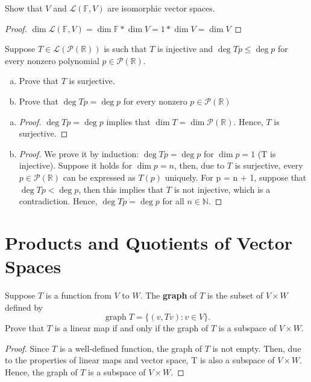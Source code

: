 \begin{exercise}
Show that $V$ and $\mathcal{L}(\mathbb{F}, V)$ are isomorphic vector spaces.
\end{exercise}
\begin{proof}
	$\operatorname{dim} \mathcal{L}(\mathbb{F}, V) = \operatorname{dim} \mathbb{F} * \operatorname{dim}V = 1 * \operatorname{dim} V = \operatorname{dim} V$
\end{proof}

\newpage

\begin{exercise}
Suppose $T \in \mathcal{L}(\mathcal{P}(\mathbb{R}))$ is such that $T$ is injective and $\operatorname{deg} Tp \le \operatorname{deg} p$ for every nonzero polynomial $p \in \mathcal{P}(\mathbb{R})$.
\begin{enumerate}[(a)]
	\item Prove that $T$ is surjective.
	\item Prove that $\operatorname{deg}Tp = \operatorname{deg}p$ for every nonzero $p \in \mathcal{P}(\mathbb{R})$
\end{enumerate}
\end{exercise}
\begin{enumerate}[(a)]
	\item \begin{proof}
		      $\operatorname{deg}Tp = \operatorname{deg}p$ implies that $\operatorname{dim} T = \operatorname{dim} \mathcal{P}(\mathbb{R})$. Hence, $T$ is surjective.
	      \end{proof}
	\item \begin{proof}
		      We prove it by induction: $\operatorname{deg}Tp = \operatorname{deg}p$ for $\operatorname{dim}p = 1$ (T is injective). Suppose it holds for $\operatorname{dim} p = n$, then, due to $T$ is surjective, every  $p \in \mathcal{P}(\mathbb{R})$ can be expressed as $T(p)$ uniquely. For p = n + 1, suppose that $\operatorname{deg}Tp < \operatorname{deg}p$, then this implies that $T$ is not injective, which is a contradiction. Hence, $\operatorname{deg}Tp = \operatorname{deg}p$ for all $n \in \mathbb{N}$.
	      \end{proof}
\end{enumerate}

\section{Products and Quotients of Vector Spaces}

\begin{exercise}
Suppose $T $ is a function from $V $ to $W $. The \textbf{graph} of $T $ is the subset of $V \times W$ defined by \[
	\operatorname{graph} T = \{(v, Tv) : v \in V\}.\]
Prove that $T$ is a linear map if and only if the graph of $T$ is a subspace of $V \times W$.
\end{exercise}
\begin{proof}
	Since $T$ is a well-defined function, the graph of $T$ is not empty. Then, due to the properties of linear maps and vector space, T is also a subspace of $V \times W$. Hence, the graph of $T$ is a subspace of $V \times W$.
\end{proof}

